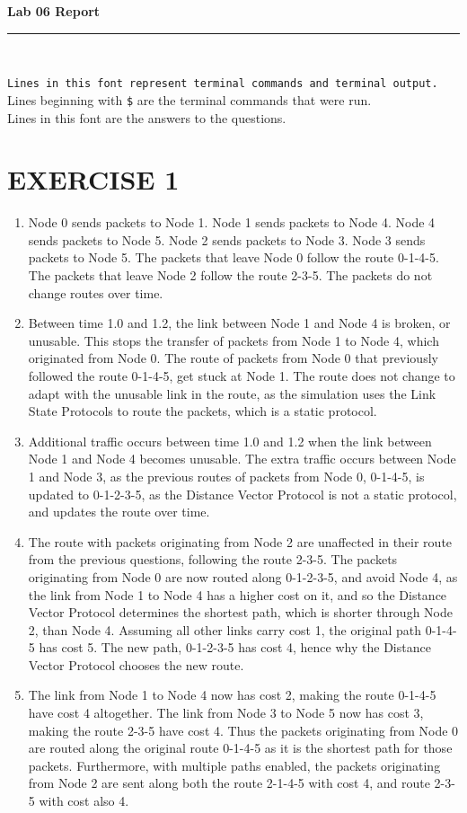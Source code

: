 \documentclass[a4paper,11pt]{article}
\newcommand{\code}{\texttt}
\newcommand{\HRule}{\rule{\linewidth}{0.5mm}} %
\begin{document}
\begin{center}
	\LARGE \textbf{Lab 06 Report}
	\HRule\\
\end{center}


\noindent \code{Lines in this font represent terminal commands and terminal output.}\\
Lines beginning with \code{\$} are the terminal commands that were run.\\
Lines in this font are the answers to the questions.

\section{EXERCISE 1}
\begin{enumerate}[leftmargin=*] 
	\item Node 0 sends packets to Node 1. Node 1 sends packets to Node 4. Node 4 sends packets to Node 5. Node 2 sends packets to Node 3. Node 3 sends packets to Node 5. The packets that leave Node 0 follow the route 0-1-4-5. The packets that leave Node 2 follow the route 2-3-5. The packets do not change routes over time.
	\item Between time 1.0 and 1.2, the link between Node 1 and Node 4 is broken, or unusable. This stops the transfer of packets from Node 1 to Node 4, which originated from Node 0. The route of packets from Node 0 that previously followed the route 0-1-4-5, get stuck at Node 1. The route does not change to adapt with the unusable link in the route, as the simulation uses the Link State Protocols to route the packets, which is a static protocol.
	\item Additional traffic occurs between time 1.0 and 1.2 when the link between Node 1 and Node 4 becomes unusable. The extra traffic occurs between Node 1 and Node 3, as the previous routes of packets from Node 0, 0-1-4-5, is updated to 0-1-2-3-5, as the Distance Vector Protocol is not a static protocol, and updates the route over time.
	\item The route with packets originating from Node 2 are unaffected in their route from the previous questions, following the route 2-3-5. The packets originating from Node 0 are now routed along 0-1-2-3-5, and avoid Node 4, as the link from Node 1 to Node 4 has a higher cost on it, and so the Distance Vector Protocol determines the shortest path, which is shorter through Node 2, than Node 4. Assuming all other links carry cost 1, the original path 0-1-4-5 has cost 5. The new path, 0-1-2-3-5 has cost 4, hence why the Distance Vector Protocol chooses the new route.
	\item The link from Node 1 to Node 4 now has cost 2, making the route 0-1-4-5 have cost 4 altogether. The link from Node 3 to Node 5 now has cost 3, making the route 2-3-5 have cost 4. Thus the packets originating from Node 0 are routed along the original route 0-1-4-5 as it is the shortest path for those packets. Furthermore, with multiple paths enabled, the packets originating from Node 2 are sent along both the route 2-1-4-5 with cost 4, and route 2-3-5 with cost also 4.
\end{enumerate}
\end{document}
